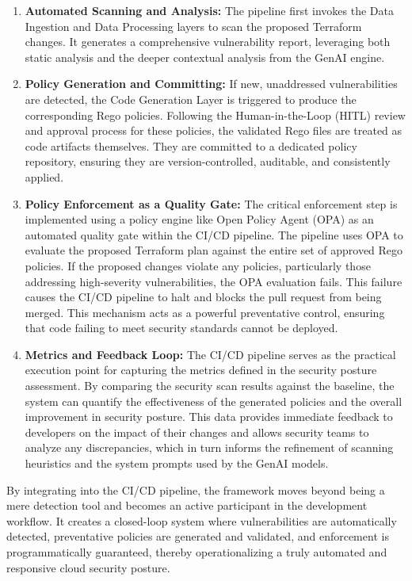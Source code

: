 \begin{enumerate}
    \item \textbf{Automated Scanning and Analysis:} The pipeline first invokes the Data Ingestion and Data Processing layers to scan the proposed Terraform changes. It generates a comprehensive vulnerability report, leveraging both static analysis and the deeper contextual analysis from the GenAI engine.

    \item \textbf{Policy Generation and Committing:} If new, unaddressed vulnerabilities are detected, the Code Generation Layer is triggered to produce the corresponding Rego policies. Following the Human-in-the-Loop (HITL) review and approval process for these policies, the validated Rego files are treated as code artifacts themselves. They are committed to a dedicated policy repository, ensuring they are version-controlled, auditable, and consistently applied.

    \item \textbf{Policy Enforcement as a Quality Gate:} The critical enforcement step is implemented using a policy engine like Open Policy Agent (OPA) as an automated quality gate within the CI/CD pipeline. The pipeline uses OPA to evaluate the proposed Terraform plan against the entire set of approved Rego policies. If the proposed changes violate any policies, particularly those addressing high-severity vulnerabilities, the OPA evaluation fails. This failure causes the CI/CD pipeline to halt and blocks the pull request from being merged. This mechanism acts as a powerful preventative control, ensuring that code failing to meet security standards cannot be deployed.

    \item \textbf{Metrics and Feedback Loop:} The CI/CD pipeline serves as the practical execution point for capturing the metrics defined in the security posture assessment. By comparing the security scan results against the baseline, the system can quantify the effectiveness of the generated policies and the overall improvement in security posture. This data provides immediate feedback to developers on the impact of their changes and allows security teams to analyze any discrepancies, which in turn informs the refinement of scanning heuristics and the system prompts used by the GenAI models.
\end{enumerate}

By integrating into the CI/CD pipeline, the framework moves beyond being a mere detection tool and becomes an active participant in the development workflow. It creates a closed-loop system where vulnerabilities are automatically detected, preventative policies are generated and validated, and enforcement is programmatically guaranteed, thereby operationalizing a truly automated and responsive cloud security posture.

